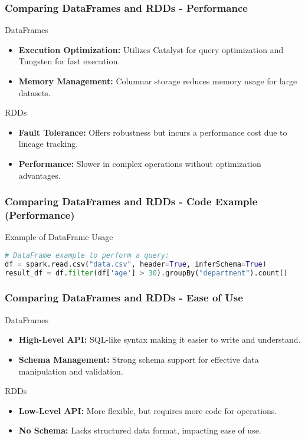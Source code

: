 \documentclass[aspectratio=169]{beamer}
\begin{document}
\begin{frame}[fragile]
    \frametitle{Comparing DataFrames and RDDs - Performance}
    \begin{block}{DataFrames}
        \begin{itemize}
            \item \textbf{Execution Optimization:} Utilizes Catalyst for query optimization and Tungsten for fast execution.
            \item \textbf{Memory Management:} Columnar storage reduces memory usage for large datasets.
        \end{itemize}
    \end{block}
    
    \begin{block}{RDDs}
        \begin{itemize}
            \item \textbf{Fault Tolerance:} Offers robustness but incurs a performance cost due to lineage tracking.
            \item \textbf{Performance:} Slower in complex operations without optimization advantages.
        \end{itemize}
    \end{block}
\end{frame}

\begin{frame}[fragile]
    \frametitle{Comparing DataFrames and RDDs - Code Example (Performance)}
    \begin{block}{Example of DataFrame Usage}
        \begin{lstlisting}[language=Python]
# DataFrame example to perform a query:
df = spark.read.csv("data.csv", header=True, inferSchema=True)
result_df = df.filter(df['age'] > 30).groupBy("department").count()
        \end{lstlisting}
    \end{block}
\end{frame}

\begin{frame}[fragile]
    \frametitle{Comparing DataFrames and RDDs - Ease of Use}
    \begin{block}{DataFrames}
        \begin{itemize}
            \item \textbf{High-Level API:} SQL-like syntax making it easier to write and understand.
            \item \textbf{Schema Management:} Strong schema support for effective data manipulation and validation.
        \end{itemize}
    \end{block}
    
    \begin{block}{RDDs}
        \begin{itemize}
            \item \textbf{Low-Level API:} More flexible, but requires more code for operations.
            \item \textbf{No Schema:} Lacks structured data format, impacting ease of use.
        \end{itemize}
    \end{block}
\end{frame}
\end{document}
